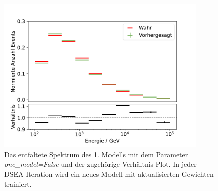 \begin{figure}
    \centering
    \includegraphics[width=0.9\textwidth]{Plots/DSEA/False/spectrum_dist_10bins_75ep_500000samples_200pulls.pdf}
    \caption[Spektrum des 1. Modells in DSEA]{Das entfaltete Spektrum des 1. Modells mit dem Parameter \textit{one\_model=False} und der zugehörige Verhältnis-Plot.
    In jeder DSEA-Iteration wird ein neues Modell mit aktualisierten Gewichten trainiert.
    }
    \label{fig:dsea_spectrum_false}
\end{figure}

